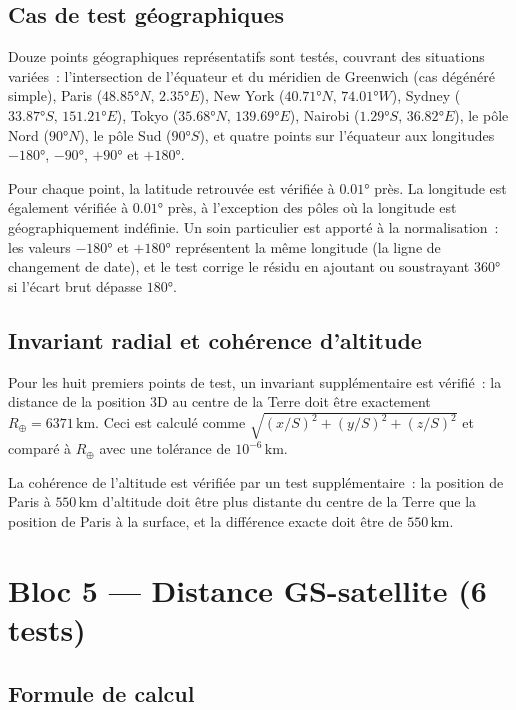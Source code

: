 \documentclass[12pt,a4paper]{article}
\begin{document}
\subsection{Cas de test géographiques}

Douze points géographiques représentatifs sont testés, couvrant des situations variées~: l'intersection de l'équateur et du méridien de Greenwich (cas dégénéré simple), Paris ($48.85°N,\, 2.35°E$), New York ($40.71°N,\, 74.01°W$), Sydney ($33.87°S,\, 151.21°E$), Tokyo ($35.68°N,\, 139.69°E$), Nairobi ($1.29°S,\, 36.82°E$), le pôle Nord ($90°N$), le pôle Sud ($90°S$), et quatre points sur l'équateur aux longitudes $-180°$, $-90°$, $+90°$ et $+180°$.

Pour chaque point, la latitude retrouvée est vérifiée à $0.01°$ près. La longitude est également vérifiée à $0.01°$ près, à l'exception des pôles où la longitude est géographiquement indéfinie. Un soin particulier est apporté à la normalisation~: les valeurs $-180°$ et $+180°$ représentent la même longitude (la ligne de changement de date), et le test corrige le résidu en ajoutant ou soustrayant $360°$ si l'écart brut dépasse $180°$.

\subsection{Invariant radial et cohérence d'altitude}

Pour les huit premiers points de test, un invariant supplémentaire est vérifié~: la distance de la position 3D au centre de la Terre doit être exactement $R_\oplus = 6371\,\text{km}$. Ceci est calculé comme $\sqrt{(x/S)^2 + (y/S)^2 + (z/S)^2}$ et comparé à $R_\oplus$ avec une tolérance de $10^{-6}\,\text{km}$.

La cohérence de l'altitude est vérifiée par un test supplémentaire~: la position de Paris à $550\,\text{km}$ d'altitude doit être plus distante du centre de la Terre que la position de Paris à la surface, et la différence exacte doit être de $550\,\text{km}$.

\section{Bloc 5 — Distance GS-satellite (6 tests)}

\subsection{Formule de calcul}
\end{document}
